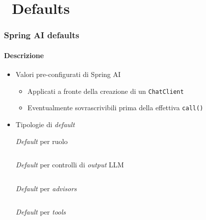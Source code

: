 \section{\faWrench\ Defaults} %
\label{sec:spring-ai-defaults}
%
\begin{frame}[t,fragile] \frametitle{Spring AI defaults}
    \framesubtitle{Descrizione}
    {\scriptsize
    \begin{itemize}[leftmargin=10pt,align=right]
        \item[\alert{\faArrowCircleRight}] Valori pre-configurati di Spring AI
        \begin{itemize}[leftmargin=10pt,align=right]
            \item[\alert{\faArrowCircleRight}] Applicati a fronte della creazione di un \texttt{ChatClient}
            \item[\alert{\faArrowCircleRight}] Eventualmente sovrascrivibili prima della effettiva \texttt{call()} 
        \end{itemize}
        \item[\alert{\faArrowCircleRight}] Tipologie di \textit{default}
        \begin{itemize}[leftmargin=10pt,align=right]
            \begin{block}{\textit{Default} per ruolo}
			    {\tiny\inputminted{java}{code/DefaultSystemUserExample.java}}
    	    \end{block}
            \begin{block}{\textit{Default} per controlli di \textit{output} LLM}
			    {\tiny\inputminted{java}{code/DefaultOptionsExample.java}}
    	    \end{block}
            \begin{block}{\textit{Default} per \textit{advisors}}
			    {\tiny\inputminted{java}{code/DefaultAdvisorsExample.java}}
    	    \end{block}
            \begin{block}{\textit{Default} per \textit{tools}}
			    {\tiny\inputminted{java}{code/DefaultToolsExample.java}}
    	    \end{block}
        \end{itemize}
    \end{itemize}
    }
\end{frame}
%
